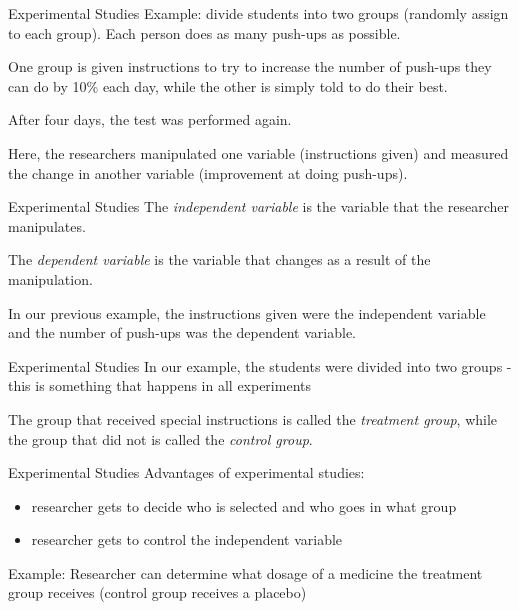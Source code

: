 \documentclass[t]{beamer}
\newcommand{\?}{\stackrel{?}{=}}
\begin{document}
	\begin{frame}{Experimental Studies}
		Example: divide students into two groups (randomly assign to each group). Each person does as many push-ups as possible. \pause
		
		One group is given instructions to try to increase the number of push-ups they can do by 10\% each day, while the other is simply told to do their best. \pause
		
		After four days, the test was performed again. \pause
		
		Here, the researchers manipulated one variable (instructions given) and measured the change in another variable (improvement at doing push-ups).
	\end{frame}

	\begin{frame}{Experimental Studies}
		The \textit{independent variable} is the variable that the researcher manipulates. \pause
		
		The \textit{dependent variable} is the variable that changes as a result of the manipulation. \pause
		
		In our previous example, the instructions given were the independent variable and the number of push-ups was the dependent variable.
	\end{frame}

	\begin{frame}{Experimental Studies}
		In our example, the students were divided into two groups - this is something that happens in all experiments \pause
		
		The group that received special instructions is called the \textit{treatment group}, while the group that did not is called the \textit{control group}.
	\end{frame}

	\begin{frame}{Experimental Studies}
		Advantages of experimental studies: \begin{itemize}
			\item researcher gets to decide who is selected and who goes in what group
			\item researcher gets to control the independent variable
		\end{itemize} \pause
	
		Example: Researcher can determine what dosage of a medicine the treatment group receives (control group receives a placebo)
	\end{frame}
\end{document}
